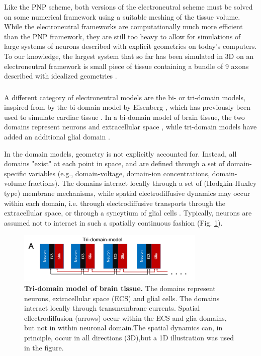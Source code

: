 Like the PNP scheme, both versions of the electroneutral scheme must be solved on some numerical framework using a suitable meshing of the tissue volume. While the electroneutral frameworks are computationally much more efficient than the PNP framework, they are still too heavy to allow for simulations of large systems of neurons described with explicit geometries on today's computers. To our knowledge, the largest system that so far has been simulated in 3D on an electroneutral framework is small piece of tissue containing a bundle of 9 axons described with idealized geometries \citep{ellingsrud2020}.


\subsubsection{}
\label{sec:Schemes:domain}
A different category of electroneutral models are the bi- or tri-domain models, inspired from by the bi-domain model by Eisenberg \citep{eisenberg1970}, which has previously been used to simulate cardiac tissue \citep{henriquez1993, sundnes2006, Mori2008}. In a bi-domain model of brain tissue, the two domains represent neurons and extracellular space \citep{Mori2015}, while tri-domain models have added an additional glial domain \citep{OConnell2016, tuttle2019}. 

In the domain models, geometry is not explicitly accounted for. Instead, all domains "exist" at each point in space, and are defined through a set of domain-specific variables (e.g., domain-voltage, domain-ion concentrations, domain-volume fractions). The domains interact locally through a set of  (Hodgkin-Huxley type) membrane mechanisms, while spatial electrodiffusive dynamics may occur within each domain, i.e. through electrodiffusive transports through the extracellular space\citep{Mori2015, OConnell2016, tuttle2019}, or through a syncytium of glial cells \citep{OConnell2016, tuttle2019}. Typically, neurons are assumed not to interact in such a spatially continuous fashion  (Fig. \ref{Schemes:fig:domainmodel}). 

\begin{figure}[!ht]
\begin{center}
\includegraphics[width=0.8\textwidth]{Figures/Schemes/Tridomain.png}
\end{center}
\caption{\textbf{Tri-domain model of brain tissue.} The domains represent neurons, extracellular space (ECS) and glial cells. The domains interact locally through transmembrane currents. Spatial ellectrodiffusion (arrows) occur within the ECS and glia domains, but not in within neuronal domain.The spatial dynamics can, in principle, occur in all directions (3D),but a 1D illustration was used in the figure. 
}
\label{Schemes:fig:domainmodel}
\end{figure}

